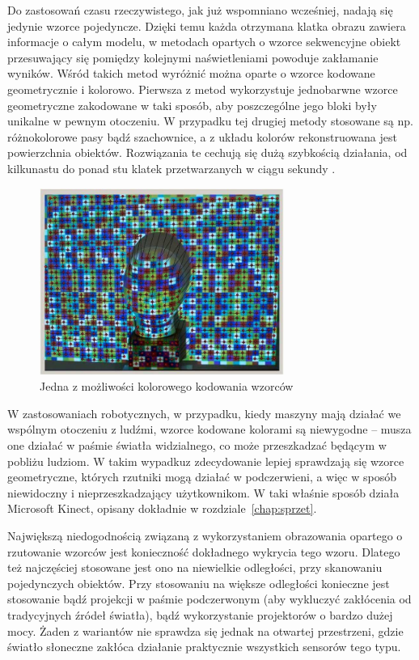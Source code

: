 Do zastosowań czasu rzeczywistego, jak już wspomniano wcześniej, nadają się
jedynie wzorce pojedyncze. Dzięki temu każda otrzymana klatka obrazu zawiera
informacje o całym modelu, w metodach opartych o wzorce sekwencyjne obiekt
przesuwający się pomiędzy kolejnymi naświetleniami powoduje zakłamanie wyników.
Wśród takich metod wyróżnić można oparte o wzorce kodowane geometrycznie i
kolorowo. Pierwsza z metod wykorzystuje jednobarwne wzorce geometryczne
zakodowane w taki sposób, aby poszczególne jego bloki były unikalne w pewnym
otoczeniu. W przypadku tej drugiej metody stosowane są np. różnokolorowe pasy
bądź szachownice, a z układu kolorów rekonstruowana jest powierzchnia obiektów.
Rozwiązania te cechują się dużą szybkością działania, od kilkunastu do ponad
stu klatek przetwarzanych w ciągu sekundy \cite{4429304}.

\begin{figure}[h!]
\centering
\includegraphics[width=8cm]{../../Common/img/struct_color}
\caption[Wzorzec kodowany kolorem]
{Jedna z możliwości kolorowego kodowania wzorców \cite{4429304}}
\label{fig:struct_color}
\end{figure}

W zastosowaniach robotycznych, w przypadku, kiedy maszyny mają działać we
wspólnym otoczeniu z ludźmi, wzorce kodowane kolorami są niewygodne -- musza one
działać w paśmie światła widzialnego, co może przeszkadzać będącym w pobliżu
ludziom. W takim wypadkuz zdecydowanie lepiej sprawdzają się wzorce
geometryczne, których rzutniki mogą działać w podczerwieni, a więc w sposób
niewidoczny i nieprzeszkadzający użytkownikom. W taki właśnie sposób działa
Microsoft Kinect, opisany dokładnie w rozdziale~\ref{chap:sprzet}.

Największą niedogodnością związaną z wykorzystaniem obrazowania opartego o
rzutowanie wzorców jest konieczność dokładnego wykrycia tego wzoru. Dlatego też
najczęściej stosowane jest ono na niewielkie odległości, przy skanowaniu
pojedynczych obiektów. Przy stosowaniu na większe odległości konieczne jest
stosowanie bądź projekcji w paśmie podczerwonym (aby wykluczyć zakłócenia od
tradycyjnych źródeł światła), bądź wykorzystanie projektorów o bardzo dużej
mocy. Żaden z wariantów nie sprawdza się jednak na otwartej przestrzeni, gdzie
światło słoneczne zakłóca działanie praktycznie wszystkich sensorów tego typu.

